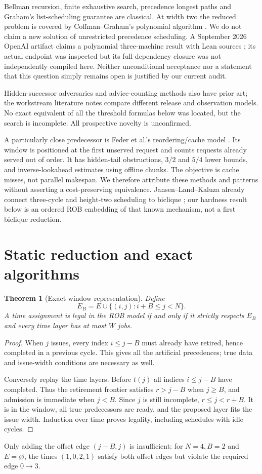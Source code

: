 \documentclass[11pt]{article}
\newtheorem{theorem}{Theorem}
\begin{document}
Bellman recursion, finite exhaustive search, precedence longest paths and
Graham's list-scheduling guarantee are classical. At width two the reduced
problem is covered by Coffman--Graham's polynomial algorithm
\cite{cg,graham}. We do not claim a new solution of unrestricted precedence
scheduling. A September 2026 OpenAI artifact claims a polynomial
three-machine result with Lean sources \cite{oai}; its actual endpoint was
inspected but its full dependency closure was not independently compiled here.
Neither unconditional acceptance nor a statement that this question simply
remains open is justified by our current audit.

Hidden-successor adversaries and advice-counting methods also have prior art;
the workstream literature notes compare different release and observation
models. No exact equivalent of all the threshold formulas below was located,
but the search is incomplete. All prospective novelty is unconfirmed.

A particularly close predecessor is Feder et al.'s reordering/cache model
\cite{feder}. Its window is positioned at the first unserved request and
counts requests already served out of order. It has hidden-tail obstructions,
$3/2$ and $5/4$ lower bounds, and inverse-lookahead estimates using offline
chunks. The objective is cache misses, not parallel makespan. We therefore
attribute these methods and patterns without asserting a cost-preserving
equivalence. Jansen--Land--Kaluza already connect three-cycle and height-two
scheduling to biclique \cite{jansen}; our hardness result below is an ordered
ROB embedding of that known mechanism, not a first biclique reduction.

\section{Static reduction and exact algorithms}
\begin{theorem}[Exact window representation]
Define
\[
 E_B=E\cup\{(i,j):i+B\le j<N\}.
\]
A time assignment is legal in the ROB model if and only if it strictly
respects $E_B$ and every time layer has at most $W$ jobs.
\end{theorem}
\begin{proof}
When $j$ issues, every index $i\le j-B$ must already have retired, hence
completed in a previous cycle. This gives all the artificial precedences;
true data and issue-width conditions are necessary as well.

Conversely replay the time layers. Before $t(j)$ all indices $i\le j-B$
have completed. Thus the retirement frontier satisfies $r>j-B$ when
$j\ge B$, and admission is immediate when $j<B$. Since $j$ is still
incomplete, $r\le j<r+B$. It is in the window, all true predecessors are
ready, and the proposed layer fits the issue width. Induction over time
proves legality, including schedules with idle cycles.
\end{proof}
Only adding the offset edge $(j-B,j)$ is insufficient: for $N=4,B=2$ and
$E=\varnothing$, the times $(1,0,2,1)$ satisfy both offset edges but violate
the required edge $0\to3$.
\end{document}
